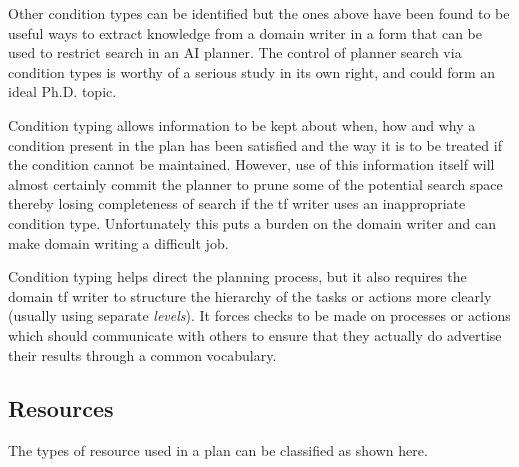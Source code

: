 Other condition types can be identified but the ones above have been found to
be useful ways to extract knowledge from a domain writer in a form that can be
used to restrict search in an AI planner.  The control of planner search via
condition types is worthy of a serious study in its own right, and could form
an ideal Ph.D. topic.

Condition typing allows information to be kept about when, how and why a
condition present in the plan has been satisfied and the way it is to be
treated if the condition cannot be maintained.  However, use of this
information itself will almost certainly commit the planner to prune some of
the potential search space thereby losing completeness of search if the {\sc
tf} writer uses an inappropriate condition type.  Unfortunately this puts a
burden on the domain writer and can make domain writing a difficult job.

Condition typing helps direct the planning process, but it also requires the
domain {\sc tf} writer to structure the hierarchy of the tasks or actions more
clearly (usually using separate {\em levels}).  It forces checks to be made on
processes or actions which should communicate with others to ensure that they
actually do advertise their results through a common vocabulary.

\subsection{Resources}

The types of resource used in a plan can be classified as shown here.



